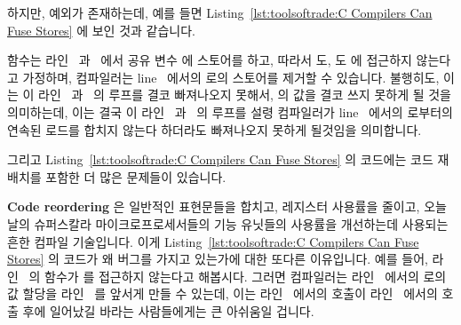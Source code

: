 {{{{하지만, 예외가 존재하는데, 예를 들면
Listing~\ref{lst:toolsoftrade:C Compilers Can Fuse Stores} 에 보인 것과
같습니다.

\begin{lineref}
 함수는 라인~ 과~ 에서 공유
변수  에 스토어를 하고, 따라서  도,
 도  에 접근하지 않는다고 가정하며, 컴파일러는
line~ 에서의  로의 스토어를 제거할 수 있습니다.
불행히도, 이는  이
라인~ 과~ 의 루프를 결코 빠져나오지
못해서,  의 값을 결코 쓰지 못하게 될 것을 의미하는데, 이는
결국  이 라인~ 과~ 의 루프를
설령 컴파일러가 line~ 에서의  로부터의
연속된 로드를 합치지 않는다 하더라도 빠져나오지 못하게 될것임을 의미합니다.

그리고 Listing~\ref{lst:toolsoftrade:C Compilers Can Fuse Stores} 의 코드에는
코드 재배치를 포함한 더 많은 문제들이 있습니다.

{\bf Code reordering} 은 일반적인 표현문들을 합치고, 레지스터 사용률을 줄이고,
오늘날의 슈퍼스칼라 마이크로프로세서들의 기능 유닛들의 사용률을 개선하는데
사용되는 흔한 컴파일 기술입니다.
이게
Listing~\ref{lst:toolsoftrade:C Compilers Can Fuse Stores} 의 코드가 왜 버그를
가지고 있는가에 대한 또다른 이유입니다.
예를 들어, 라인~ 의  함수가
 를 접근하지 않는다고 해봅시다.
그러면 컴파일러는 라인~ 에서의  로의 값
할당을 라인~ 를 앞서게 만들 수 있는데, 이는
라인~ 에서의  호출이 라인~
에서의  호출 후에 일어났길 바라는 사람들에게는 큰
아쉬움일 겁니다.
\iffalse


\end{lineref}}}}}
